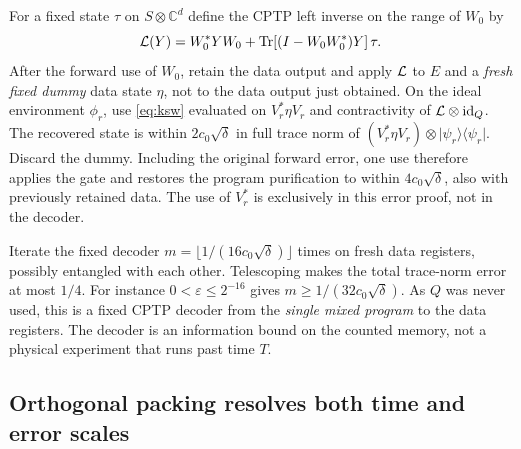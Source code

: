\documentclass[11pt]{article}
\theoremstyle{remark}
\newcommand{\tr}{\operatorname{Tr}}
\newcommand{\Id}{\mathrm{id}}
\newcommand{\proj}[1]{\lvert #1\rangle\!\langle #1\rvert}
\begin{document}
For a fixed state \(\tau\) on \(S\otimes\mathbb C^d\) define the
CPTP left inverse on the range of \(W_0\) by
\begin{equation}\label{eq:inverse}
 {\cal L}(Y)=W_0^*YW_0+
   \tr[(I-W_0W_0^*)Y]\,\tau.
\end{equation}
After the forward use of \(W_0\), retain the data output and apply
\({\cal L}\) to \(E\) and a \emph{fresh fixed dummy} data state
\(\eta\), not to the data output just obtained. On the ideal
environment \(\phi_r\), use \eqref{eq:ksw} evaluated on
\(V_r^*\eta V_r\) and contractivity of \({\cal L}\otimes\Id_Q\).
The recovered state is within \(2c_0\sqrt\delta\) in full trace norm
of \((V_r^*\eta V_r)\otimes\proj{\psi_r}\). Discard the dummy.
Including the original forward error, one use therefore applies
the gate and restores the program purification to within
\(4c_0\sqrt\delta\), also with previously retained data. The use
of \(V_r^*\) is exclusively in this error proof, not in the decoder.

Iterate the fixed decoder
\(m=\lfloor 1/(16c_0\sqrt\delta)\rfloor\) times on fresh data
registers, possibly entangled with each other. Telescoping makes
the total trace-norm error at most \(1/4\). For instance
\(0<\varepsilon\le2^{-16}\) gives
\(m\ge 1/(32c_0\sqrt\delta)\). As \(Q\) was never used, this is
a fixed CPTP decoder from the \emph{single mixed program} to the
data registers. The decoder is an information bound on the counted
memory, not a physical experiment that runs past time \(T\).

\subsection{Orthogonal packing resolves both time and error scales}
\end{document}
